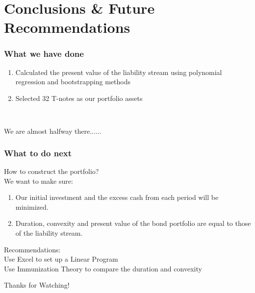 \documentclass[compress,handout,10pt]{beamer}
\let\olditem\item
\renewcommand{\item}{\setlength{\itemsep}{0.5\baselineskip}\olditem}
\begin{document}
\section{Conclusions \& Future Recommendations}
\begin{frame}
    \frametitle{What we have done}
\begin{enumerate}
\item Calculated the present value of the liability stream using polynomial regression and bootstrapping methods\\
\item Selected 32 T-notes as our portfolio assets\\
\end{enumerate}
\vspace{15mm}
\huge\centerline\emph\ {We are almost halfway there......}
\end{frame}


\begin{frame}
    \frametitle{What to do next}
How to construct the portfolio? \\
\vspace{3mm}
We want to make sure: 
\begin{enumerate}
\item Our initial investment and the excess cash from each period will be minimized.
\item Duration, convexity and present value of the bond portfolio are equal to those of the liability stream.
\end{enumerate}
\vspace{5mm}
Recommendations: \\
\vspace{1mm}
Use Excel to set up a Linear Program\\
\vspace{2mm}
Use Immunization Theory to compare the duration and convexity
\end{frame}

\begin{frame}
\Huge\centerline {Thanks for Watching!}
\end{frame}
\end{document}
